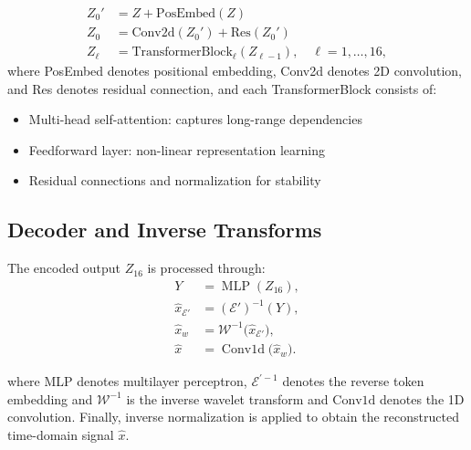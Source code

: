 \documentclass[prd,aps,a4paper,twocolumn,superscriptaddress,nofootinbib,floatfix]{revtex4-2}
\begin{document}
\begin{align}
    Z_0' &= Z + \text{PosEmbed}(Z) \\
    Z_0  &= \text{Conv2d}(Z_0')+\text{Res}(Z_0')\\
    Z_{\ell} &= \text{TransformerBlock}_{\ell}(Z_{\ell-1}), \quad \ell=1,\dots,16,
\end{align}
where PosEmbed denotes positional embedding, Conv2d denotes 2D convolution, and Res denotes residual connection, and each TransformerBlock consists of:
\begin{itemize}
    \item Multi-head self-attention: captures long-range dependencies
    \item Feedforward layer: non-linear representation learning
    \item Residual connections and normalization for stability
\end{itemize}

\subsection{Decoder and Inverse Transforms}
\label{app:decoder_inverse}
The encoded output $Z_{16}$ is processed through:
\begin{align}
  Y &= \operatorname{MLP}(Z_{16}), \\
  \hat{x}_{\mathcal E'} &= (\mathcal E')^{-1}(Y), \\
  \hat{x}_{w} &= \mathcal W^{-1}\!\bigl(\hat{x}_{\mathcal E'}\bigr), \\
  \hat{x} &= \operatorname{Conv1d}\!\bigl(\hat{x}_{w}\bigr).
\end{align}

where MLP denotes multilayer perceptron, $\mathcal{E}^{\prime-1}$ denotes the reverse token embedding and $\mathcal{W}^{-1}$ is the inverse wavelet transform and $\text{Conv1d}$ denotes the 1D convolution. Finally, inverse normalization is applied to obtain the reconstructed time-domain signal $\hat{x}$.

\newpage

\end{document}
